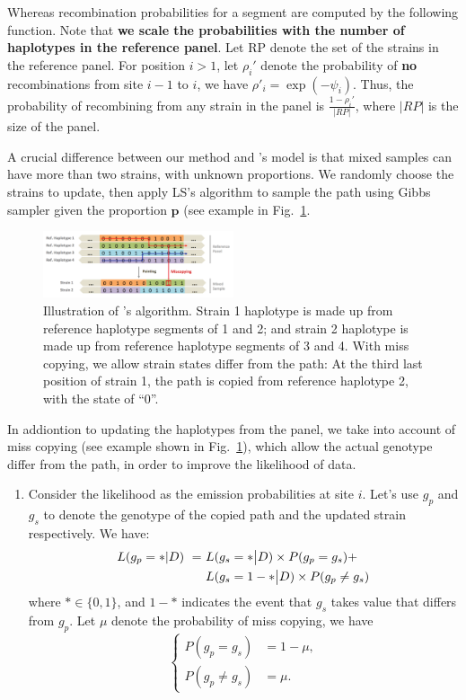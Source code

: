 \documentclass{bioinfo}
\begin{document}
\begin{methods}
Whereas recombination probabilities for a segment are computed by the following function. Note that {\bf we scale the probabilities with the number of haplotypes in the reference panel}. Let $\textrm{RP}$ denote the set of the strains in the reference panel. For position $i > 1$, let $\rho_i'$ denote the probability of {\bf no} recombinations from site $i-1$ to $i$, we have $\rho'_i = \exp(-\psi_i)$. Thus, the probability of recombining from any strain in the panel is $\displaystyle\frac{1-\rho_i'}{|RP|}$, where $|RP|$ is the size of the panel.


A crucial difference between our method and \citet{Li2003}'s model is that mixed samples can have more than two strains, with unknown proportions. We randomly choose the strains to update, then apply LS's algorithm to sample the path using Gibbs sampler given the proportion $\mathbf p$ (see example in Fig.~\ref{fig:ls}.

\begin{figure}[ht]
\centering
\includegraphics[width=0.5\textwidth]{coupled-painting.png}
\caption{Illustration of \citet{Li2003}'s algorithm. Strain 1 haplotype is made up from reference haplotype segments of 1 and 2; and strain 2 haplotype is made up from reference haplotype segments of 3 and 4. With miss copying, we allow strain states differ from the path: At the third last position of strain 1, the path is copied from reference haplotype 2, with the state of ``0''.
}\label{fig:ls}
\end{figure}

In addiontion to updating the haplotypes from the panel, we take into account of miss copying (see example shown in Fig.~\ref{fig:ls}), which allow the actual genotype differ from the path, in order to improve the likelihood of data.

\begin{enumerate}
\item Consider the likelihood as the emission probabilities at site $i$. Let's use $g_p$ and $g_s$ to denote the genotype of the copied path and the updated strain respectively. We have:
\begin{equation}
\begin{split}
L(g_p = * | D) ~ = ~ & L(g_s = * \big{|} D) \times P(g_p = g_s) + \\
                     & L(g_s = 1 - * \big{|} D) \times P(g_p \neq g_s) \label{eqn:gp_given_D}
\end{split}
\end{equation}
where $*\in \{0,1\}$, and $1-*$ indicates the event that $g_s$ takes value that differs from $g_p$. Let $\mu$ denote the probability of miss copying, we have
$$\begin{cases}
P(g_p = g_s) &= 1-\mu, \\
P(g_p \neq g_s) &= \mu .\end{cases}$$


\end{enumerate}
\end{methods}
\end{document}
